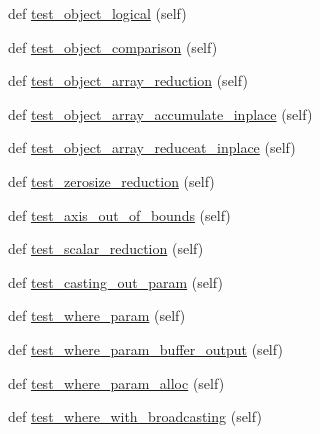 \begin{DoxyCompactItemize}
\item 
def \hyperlink{classnumpy_1_1core_1_1tests_1_1test__ufunc_1_1TestUfunc_a2be6cf68c395357918b30c24385bfc0d}{test\+\_\+object\+\_\+logical} (self)
\item 
def \hyperlink{classnumpy_1_1core_1_1tests_1_1test__ufunc_1_1TestUfunc_adaec3e6a0c2376243ac7ad638ef4c37a}{test\+\_\+object\+\_\+comparison} (self)
\item 
def \hyperlink{classnumpy_1_1core_1_1tests_1_1test__ufunc_1_1TestUfunc_a42952d9af16971cc6f970f8cd8299a84}{test\+\_\+object\+\_\+array\+\_\+reduction} (self)
\item 
def \hyperlink{classnumpy_1_1core_1_1tests_1_1test__ufunc_1_1TestUfunc_a2ccba20d3bc16c7e8c6ccca2018dcb1f}{test\+\_\+object\+\_\+array\+\_\+accumulate\+\_\+inplace} (self)
\item 
def \hyperlink{classnumpy_1_1core_1_1tests_1_1test__ufunc_1_1TestUfunc_a1f29318a826f11efc27cc8096dcf7cdb}{test\+\_\+object\+\_\+array\+\_\+reduceat\+\_\+inplace} (self)
\item 
def \hyperlink{classnumpy_1_1core_1_1tests_1_1test__ufunc_1_1TestUfunc_abc0e7e1821175ff1669e29216cf2e5b1}{test\+\_\+zerosize\+\_\+reduction} (self)
\item 
def \hyperlink{classnumpy_1_1core_1_1tests_1_1test__ufunc_1_1TestUfunc_ab106bf4510b1eb56897cb372a38861bf}{test\+\_\+axis\+\_\+out\+\_\+of\+\_\+bounds} (self)
\item 
def \hyperlink{classnumpy_1_1core_1_1tests_1_1test__ufunc_1_1TestUfunc_aded2a651f732c75683935f98436f47d4}{test\+\_\+scalar\+\_\+reduction} (self)
\item 
def \hyperlink{classnumpy_1_1core_1_1tests_1_1test__ufunc_1_1TestUfunc_a1efd20ec662ae15ab2a3c14d44dd30aa}{test\+\_\+casting\+\_\+out\+\_\+param} (self)
\item 
def \hyperlink{classnumpy_1_1core_1_1tests_1_1test__ufunc_1_1TestUfunc_a3c493b2d7e8d642684f9e47d2d7dd49d}{test\+\_\+where\+\_\+param} (self)
\item 
def \hyperlink{classnumpy_1_1core_1_1tests_1_1test__ufunc_1_1TestUfunc_a7fffb87ec6a61931204f21bd0f0a2192}{test\+\_\+where\+\_\+param\+\_\+buffer\+\_\+output} (self)
\item 
def \hyperlink{classnumpy_1_1core_1_1tests_1_1test__ufunc_1_1TestUfunc_a538a6bcefe80b188044126e417a4ee93}{test\+\_\+where\+\_\+param\+\_\+alloc} (self)
\item 
def \hyperlink{classnumpy_1_1core_1_1tests_1_1test__ufunc_1_1TestUfunc_a9e23fd75a3549abaa5373291ed4980eb}{test\+\_\+where\+\_\+with\+\_\+broadcasting} (self)

\end{DoxyCompactItemize}
